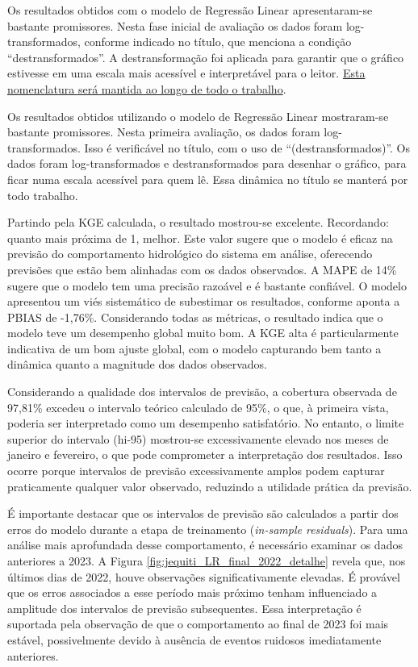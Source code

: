 Os resultados obtidos com o modelo de Regressão Linear apresentaram-se bastante promissores. Nesta fase inicial de avaliação os dados foram log-transformados, conforme indicado no título, que menciona a condição ``destransformados''. A destransformação foi aplicada para garantir que o gráfico estivesse em uma escala mais acessível e interpretável para o leitor. \underline{Esta nomenclatura será mantida ao longo de todo o trabalho}.

Os resultados obtidos utilizando o modelo de Regressão Linear mostraram-se bastante promissores. Nesta primeira avaliação, os dados foram log-transformados. Isso é verificável no título, com o uso de ``(destransformados)''. Os dados foram log-transformados e destransformados para desenhar o gráfico, para ficar numa escala acessível para quem lê. Essa dinâmica no título se manterá por todo trabalho.

Partindo pela KGE calculada, o resultado mostrou-se excelente. Recordando: quanto mais próxima de 1, melhor. Este valor sugere que o modelo é eficaz na previsão do comportamento hidrológico do sistema em análise, oferecendo previsões que estão bem alinhadas com os dados observados. A MAPE de 14\% sugere que o modelo tem uma precisão razoável e é bastante confiável. O modelo apresentou um viés sistemático de subestimar os resultados, conforme aponta a PBIAS de -1,76\%. Considerando todas as métricas, o resultado indica que o modelo teve um desempenho global muito bom. A KGE alta é particularmente indicativa de um bom ajuste global, com o modelo capturando bem tanto a dinâmica quanto a magnitude dos dados observados.

Considerando a qualidade dos intervalos de previsão, a cobertura observada de 97,81\% excedeu o intervalo teórico calculado de 95\%, o que, à primeira vista, poderia ser interpretado como um desempenho satisfatório. No entanto, o limite superior do intervalo (hi-95) mostrou-se excessivamente elevado nos meses de janeiro e fevereiro, o que pode comprometer a interpretação dos resultados. Isso ocorre porque intervalos de previsão excessivamente amplos podem capturar praticamente qualquer valor observado, reduzindo a utilidade prática da previsão.

É importante destacar que os intervalos de previsão são calculados a partir dos erros do modelo durante a etapa de treinamento (\textit{in-sample residuals}). Para uma análise mais aprofundada desse comportamento, é necessário examinar os dados anteriores a 2023. A Figura \ref{fig:jequiti_LR_final_2022_detalhe} revela que, nos últimos dias de 2022, houve observações significativamente elevadas. É provável que os erros associados a esse período mais próximo tenham influenciado a amplitude dos intervalos de previsão subsequentes. Essa interpretação é suportada pela observação de que o comportamento ao final de 2023 foi mais estável, possivelmente devido à ausência de eventos ruidosos imediatamente anteriores.

